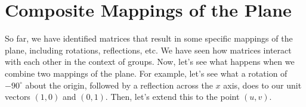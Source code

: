 \documentclass[../gatm.tex]{subfiles}
\begin{document}
\section{Composite Mappings of the Plane}
\setcounter{problem_i}{0}

So far, we have identified matrices that result in some specific mappings of the plane, including rotations, reflections, etc. We have seen how matrices interact with each other in the context of groups. Now, let's see what happens when we combine two mappings of the plane. For example, let's see what a rotation of $-90^\circ$ about the origin, followed by a reflection across the $x$ axis, does to our unit vectors $(1,0)$ and $(0,1)$. Then, let's extend this to the point $(u,v)$.

\newcommand{\blanktwomat}{\twomat{\phantom{0}}{\phantom{0}}{}{}}
\end{document}
